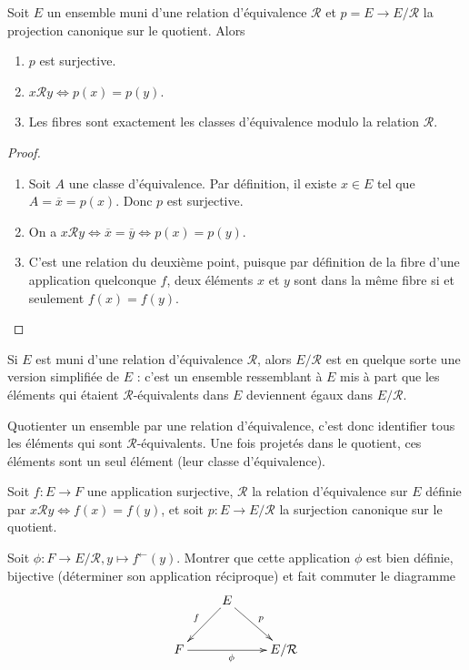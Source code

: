 \begin{proposition}
Soit $E$ un ensemble muni d'une relation d'équivalence ${\mathcal R}$ et $p = E\to E/\mathcal R$ la projection canonique sur le quotient. Alors 
\begin{enumerate}
\item $p$ est surjective.
\item $x\mathcal R y \iff p(x)=p(y)$.
\item Les fibres sont exactement les classes d'équivalence modulo la relation $\mathcal R$.
\end{enumerate}
\end{proposition}
\begin{proof}
\begin{enumerate}
\item Soit $A$ une classe d'équivalence. Par définition, il existe $x\in E$ tel que $A = \overline{x} = p(x)$. Donc $p$ est surjective.
\item On a $x\mathcal R y \iff \overline{x} = \overline{y} \iff p(x)=p(y)$.
\item C'est une relation du deuxième point, puisque par définition de la fibre d'une application quelconque $f$, deux éléments $x$ et $y$ sont dans la même fibre si et seulement $f(x)=f(y)$.
\end{enumerate}
\end{proof}


\begin{mdframed}[linewidth=2]
Si $E$ est muni d'une relation d'équivalence $\mathcal R$, alors $E/\mathcal R$ est en quelque sorte une version  \og simplifiée\fg{} de $E$ : c'est un ensemble ressemblant à $E$ mis à part que les éléments qui étaient $\mathcal R$-équivalents dans $E$ deviennent  égaux dans $E/\mathcal R$.

Quotienter un ensemble par une relation d'équivalence, c'est donc identifier tous les éléments qui sont $\mathcal R$-équivalents. Une fois projetés dans le quotient, ces éléments sont un seul élément (leur classe d'équivalence).
\end{mdframed}

\begin{exercice}
Soit $f : E\to F$ une application surjective, $\mathcal R$ la relation d'équivalence sur $E$ définie par $x\mathcal R y \iff f(x)=f(y)$, et soit $p : E\to E/\mathcal R$ la surjection canonique sur le quotient. 

Soit $\phi :  F \to E/\mathcal R, y\mapsto f^\leftarrow(y)$. Montrer que  cette application $\phi$ est bien définie, bijective (déterminer son application réciproque) et fait commuter le diagramme
\[\xymatrix{
& E \ar[dl]_{f} \ar[dr]^p & \\
F \ar[rr]_{\phi}& & E/\mathcal R
}\]
\end{exercice}



